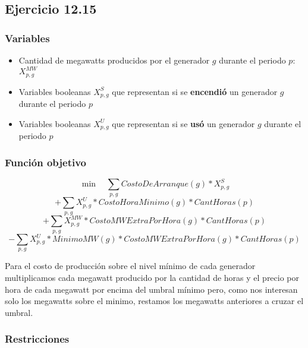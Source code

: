 \subsection{Ejercicio 12.15}
\subsubsection{Variables}
\begin{itemize}
    \item Cantidad de megawatts producidos por el generador $g$ durante el periodo $p$: $X^{MW}_{p,g}$
    \item Variables booleanas $X^{S}_{p,g}$ que representan si se \textbf{encendió} un generador $g$ durante el periodo $p$
    \item Variables booleanas $X^{U}_{p,g}$ que representan si se \textbf{usó} un generador $g$ durante el periodo $p$
\end{itemize}

\subsubsection{Función objetivo}

$$\min \quad \sum_{p,g} CostoDeArranque(g)*X^S_{p,g}$$
$$+ \sum_{p,g} X^{U}_{p,g} * CostoHoraMinimo(g) * CantHoras(p)$$
$$+ \sum_{p,g} X^{MW}_{p,g} * CostoMWExtraPorHora(g) * CantHoras(p)$$
$$- \sum_{p,g} X^{U}_{p,g} * MinimoMW(g) * CostoMWExtraPorHora(g) * CantHoras(p) $$

Para el costo de producción sobre el nivel mínimo de cada generador multiplicamos cada megawatt producido por la cantidad de horas y el precio por hora de cada megawatt por encima del umbral mínimo pero, como nos interesan solo los megawatts sobre el minimo, restamos los megawatts anteriores a cruzar el umbral.

\subsubsection{Restricciones}

